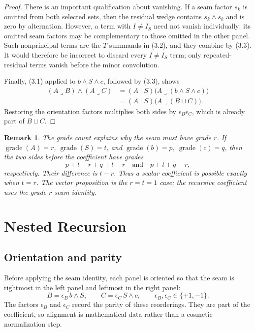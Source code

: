 \documentclass[11pt]{article}
\newtheorem{remark}{Remark}
\begin{document}
\begin{proof}
There is an important qualification about vanishing. If a seam factor
\(s_k\) is omitted from both selected sets, then the residual wedge contains
\(s_k\wedge s_k\) and is zero by alternation. However, a term with
\(I\ne I_S\) need not vanish individually: its omitted seam factors may be
complementary to those omitted in the other panel. Such nonprincipal terms
are the \(T\)-summands in (3.2), and they combine by (3.3). It would therefore
be incorrect to discard every \(I\ne I_S\) term; only repeated-residual
terms vanish before the minor convolution.

Finally, (3.1) applied to \(b\wedge S\wedge c\), followed by (3.3), shows
\[
\begin{aligned}
(A\mathbin{\lrcorner}B)\wedge(A\mathbin{\lrcorner}C)
 &= (A\mid S)\bigl(A\mathbin{\lrcorner}(b\wedge S\wedge c)\bigr)\\
 &= (A\mid S)\bigl(A\mathbin{\lrcorner}(B\sqcup C)\bigr).
\end{aligned}
\]
Restoring the orientation factors multiplies both sides by
\(\epsilon_B\epsilon_C\), which is already part of \(B\sqcup C\).
\end{proof}

\begin{remark}
The grade count explains why the seam must have grade \(r\). If
\(\operatorname{grade}(A)=r\), \(\operatorname{grade}(S)=t\), and
\(\operatorname{grade}(b)=p\), \(\operatorname{grade}(c)=q\), then the two
sides before the coefficient have grades
\[
  p+t-r+q+t-r
  \quad\text{and}\quad
  p+t+q-r,
\]
respectively. Their difference is \(t-r\). Thus a scalar coefficient is
possible exactly when \(t=r\). The vector proposition is the \(r=t=1\)
case; the recursive coefficient uses the grade-\(r\) seam identity.
\end{remark}

\section{Nested Recursion}

\subsection{Orientation and parity}

Before applying the seam identity, each panel is oriented so that the seam is
rightmost in the left panel and leftmost in the right panel:
\[
B=\epsilon_B\,b\wedge S,\qquad
C=\epsilon_C\,S\wedge c,\qquad
\epsilon_B,\epsilon_C\in\{+1,-1\}.
\]
The factors \(\epsilon_B\) and \(\epsilon_C\) record the parity of these
reorderings. They are part of the coefficient, so alignment is mathematical
data rather than a cosmetic normalization step.
\end{document}
